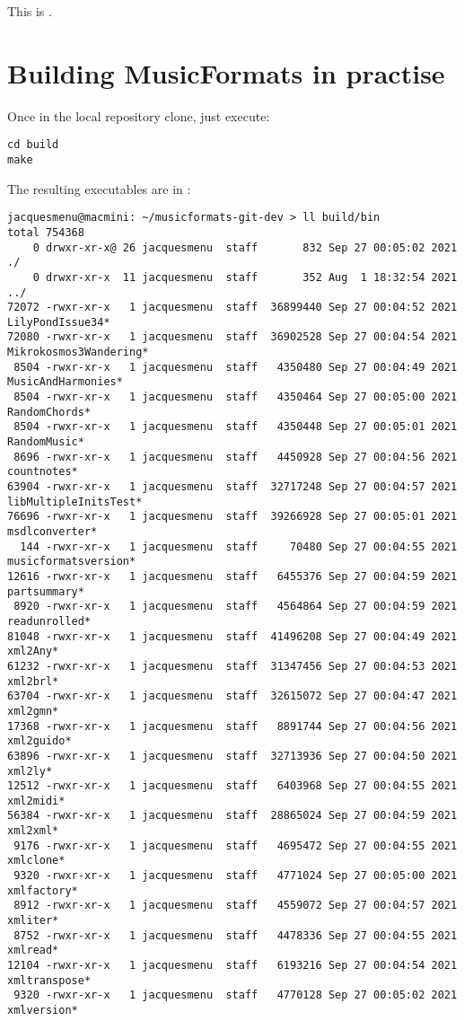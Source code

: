 This  is .


\section{Building MusicFormats in practise}

Once in the local repository clone, just execute:
\begin{lstlisting}[language=Terminal]
cd build
make
\end{lstlisting}

The resulting executables are in :
\begin{lstlisting}[language=Terminal]
jacquesmenu@macmini: ~/musicformats-git-dev > ll build/bin
total 754368
    0 drwxr-xr-x@ 26 jacquesmenu  staff       832 Sep 27 00:05:02 2021 ./
    0 drwxr-xr-x  11 jacquesmenu  staff       352 Aug  1 18:32:54 2021 ../
72072 -rwxr-xr-x   1 jacquesmenu  staff  36899440 Sep 27 00:04:52 2021 LilyPondIssue34*
72080 -rwxr-xr-x   1 jacquesmenu  staff  36902528 Sep 27 00:04:54 2021 Mikrokosmos3Wandering*
 8504 -rwxr-xr-x   1 jacquesmenu  staff   4350480 Sep 27 00:04:49 2021 MusicAndHarmonies*
 8504 -rwxr-xr-x   1 jacquesmenu  staff   4350464 Sep 27 00:05:00 2021 RandomChords*
 8504 -rwxr-xr-x   1 jacquesmenu  staff   4350448 Sep 27 00:05:01 2021 RandomMusic*
 8696 -rwxr-xr-x   1 jacquesmenu  staff   4450928 Sep 27 00:04:56 2021 countnotes*
63904 -rwxr-xr-x   1 jacquesmenu  staff  32717248 Sep 27 00:04:57 2021 libMultipleInitsTest*
76696 -rwxr-xr-x   1 jacquesmenu  staff  39266928 Sep 27 00:05:01 2021 msdlconverter*
  144 -rwxr-xr-x   1 jacquesmenu  staff     70480 Sep 27 00:04:55 2021 musicformatsversion*
12616 -rwxr-xr-x   1 jacquesmenu  staff   6455376 Sep 27 00:04:59 2021 partsummary*
 8920 -rwxr-xr-x   1 jacquesmenu  staff   4564864 Sep 27 00:04:59 2021 readunrolled*
81048 -rwxr-xr-x   1 jacquesmenu  staff  41496208 Sep 27 00:04:49 2021 xml2Any*
61232 -rwxr-xr-x   1 jacquesmenu  staff  31347456 Sep 27 00:04:53 2021 xml2brl*
63704 -rwxr-xr-x   1 jacquesmenu  staff  32615072 Sep 27 00:04:47 2021 xml2gmn*
17368 -rwxr-xr-x   1 jacquesmenu  staff   8891744 Sep 27 00:04:56 2021 xml2guido*
63896 -rwxr-xr-x   1 jacquesmenu  staff  32713936 Sep 27 00:04:50 2021 xml2ly*
12512 -rwxr-xr-x   1 jacquesmenu  staff   6403968 Sep 27 00:04:55 2021 xml2midi*
56384 -rwxr-xr-x   1 jacquesmenu  staff  28865024 Sep 27 00:04:59 2021 xml2xml*
 9176 -rwxr-xr-x   1 jacquesmenu  staff   4695472 Sep 27 00:04:55 2021 xmlclone*
 9320 -rwxr-xr-x   1 jacquesmenu  staff   4771024 Sep 27 00:05:00 2021 xmlfactory*
 8912 -rwxr-xr-x   1 jacquesmenu  staff   4559072 Sep 27 00:04:57 2021 xmliter*
 8752 -rwxr-xr-x   1 jacquesmenu  staff   4478336 Sep 27 00:04:55 2021 xmlread*
12104 -rwxr-xr-x   1 jacquesmenu  staff   6193216 Sep 27 00:04:54 2021 xmltranspose*
 9320 -rwxr-xr-x   1 jacquesmenu  staff   4770128 Sep 27 00:05:02 2021 xmlversion*
\end{lstlisting}

